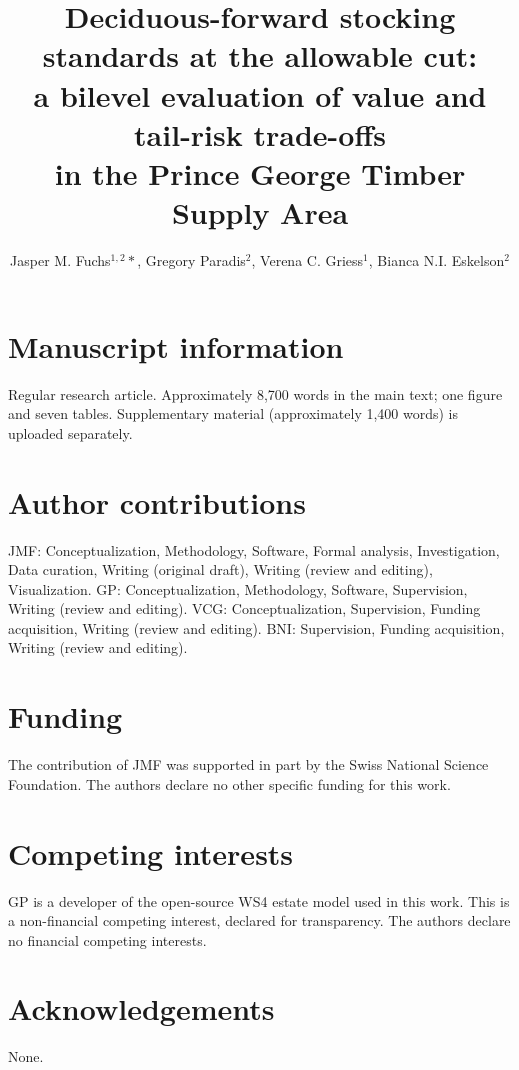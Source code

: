 \documentclass{article}
\title{Deciduous-forward stocking standards at the allowable cut:\\a bilevel evaluation of value and tail-risk trade-offs\\in the Prince George Timber Supply Area}
\author{Jasper M. Fuchs$^{1,2}*$, Gregory Paradis$^2$, Verena C. Griess$^1$, Bianca N.I. Eskelson$^2$}
\date{\vspace{1cm}\raggedright
    $^1$Department of Environmental Systems Science, Institute of Terrestrial Ecosystems, ETH Zurich, Switzerland\\
    $^2$Department of Forest Resources Management, The University of British Columbia, Canada\\
    $*$\textit{corresponding author: jasper.fuchs@usys.ethz.ch}\\
    \vspace{1cm}November 2026}
\begin{document}
\maketitle

\section*{Manuscript information}
Regular research article. Approximately 8,700 words in the main text; one figure and seven tables.
Supplementary material (approximately 1,400 words) is uploaded separately.

\section*{Author contributions}
JMF: Conceptualization, Methodology, Software, Formal analysis, Investigation, Data curation,
Writing (original draft), Writing (review and editing), Visualization. GP: Conceptualization,
Methodology, Software, Supervision, Writing (review and editing). VCG: Conceptualization,
Supervision, Funding acquisition, Writing (review and editing). BNI: Supervision, Funding
acquisition, Writing (review and editing).

\section*{Funding}
The contribution of JMF was supported in part by the Swiss National Science Foundation. The authors
declare no other specific funding for this work.

\section*{Competing interests}
GP is a developer of the open-source WS4 estate model used in this work. This is a non-financial
competing interest, declared for transparency. The authors declare no financial competing interests.

\section*{Acknowledgements}
None.
\end{document}
